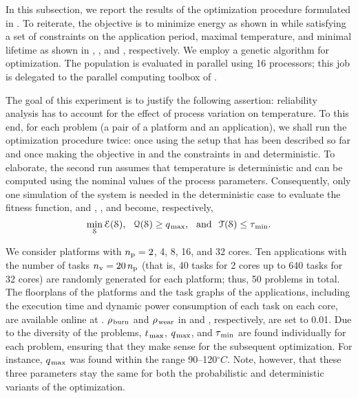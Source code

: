 In this subsection, we report the results of the optimization procedure formulated in .
To reiterate, the objective is to minimize energy as shown in  while satisfying a set of constraints on the application period, maximal temperature, and minimal lifetime as shown in , , and , respectively.
We employ a genetic algorithm for optimization.
The population is evaluated in parallel using 16 processors; this job is delegated to the parallel computing toolbox of  \cite{matlab}.

The goal of this experiment is to justify the following assertion: reliability analysis has to account for the effect of process variation on temperature.
To this end, for each problem (a pair of a platform and an application), we shall run the optimization procedure twice: once using the setup that has been described so far and once making the objective in  and the constraints in  and  deterministic.
To elaborate, the second run assumes that temperature is deterministic and can be computed using the nominal values of the process parameters.
Consequently, only one simulation of the system is needed in the deterministic case to evaluate the fitness function, and , , and  become, respectively,
\[
  \min_{\EuScript{S}} \EuScript{E}(\EuScript{S}), \hspace{0.7em} \EuScript{Q}(\EuScript{S}) \geq q_{\text{\kern0.1emmax}}, \hspace{0.7em} \text{and} \hspace{0.7em} \EuScript{T}(\EuScript{S}) \leq \tau_{\text{\kern0.1emmin}}.
\]


We consider platforms with ${n_\text{p}} = 2$, 4, 8, 16, and 32 cores.
Ten applications with the number of tasks ${n_\text{v}} = 20 \, {n_\text{p}}$ (that is, 40 tasks for 2 cores up to 640 tasks for 32 cores) are randomly generated for each platform; thus, 50 problems in total.
The floorplans of the platforms and the task graphs of the applications, including the execution time and dynamic power consumption of each task on each core, are available online at \cite{sources}.
$\rho_{\text{\kern0.1emburn}}$ and $\rho_{\text{\kern0.1emwear}}$ in  and , respectively, are set to 0.01.
Due to the diversity of the problems, $t_{\text{\kern0.1emmax}}$, $q_{\text{\kern0.1emmax}}$, and $\tau_{\text{\kern0.1emmin}}$ are found individually for each problem, ensuring that they make sense for the subsequent optimization.
For instance, $q_{\text{\kern0.1emmax}}$ was found within the range 90--120${}^\circ{}C$.
Note, however, that these three parameters stay the same for both the probabilistic and deterministic variants of the optimization.

